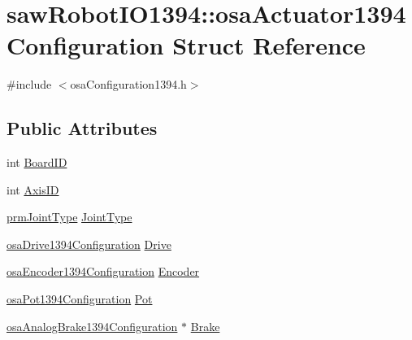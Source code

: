 \hypertarget{structsaw_robot_i_o1394_1_1osa_actuator1394_configuration}{}\section{saw\+Robot\+I\+O1394\+:\+:osa\+Actuator1394\+Configuration Struct Reference}
\label{structsaw_robot_i_o1394_1_1osa_actuator1394_configuration}


{\ttfamily \#include $<$osa\+Configuration1394.\+h$>$}

\subsection*{Public Attributes}
\begin{DoxyCompactItemize}
\item 
int \hyperlink{structsaw_robot_i_o1394_1_1osa_actuator1394_configuration_a22cc3448ab6886b8b23dd8a16445ad86}{Board\+I\+D}
\item 
int \hyperlink{structsaw_robot_i_o1394_1_1osa_actuator1394_configuration_afef5e3b088b5b6bd63c71e424ac9b48b}{Axis\+I\+D}
\item 
\hyperlink{prm_joint_type_8h_a895942aa22779beb318114dcff38b5af}{prm\+Joint\+Type} \hyperlink{structsaw_robot_i_o1394_1_1osa_actuator1394_configuration_a4f232ffae661ac78270858c1c68c2859}{Joint\+Type}
\item 
\hyperlink{structsaw_robot_i_o1394_1_1osa_drive1394_configuration}{osa\+Drive1394\+Configuration} \hyperlink{structsaw_robot_i_o1394_1_1osa_actuator1394_configuration_aa2c6db368b235c58efb11afa489d9f0e}{Drive}
\item 
\hyperlink{structsaw_robot_i_o1394_1_1osa_encoder1394_configuration}{osa\+Encoder1394\+Configuration} \hyperlink{structsaw_robot_i_o1394_1_1osa_actuator1394_configuration_a9f6160c86aca21cc9024a0b4e8e58453}{Encoder}
\item 
\hyperlink{structsaw_robot_i_o1394_1_1osa_pot1394_configuration}{osa\+Pot1394\+Configuration} \hyperlink{structsaw_robot_i_o1394_1_1osa_actuator1394_configuration_a05332a1631f974de8304f4210e9e33e8}{Pot}
\item 
\hyperlink{structsaw_robot_i_o1394_1_1osa_analog_brake1394_configuration}{osa\+Analog\+Brake1394\+Configuration} $\ast$ \hyperlink{structsaw_robot_i_o1394_1_1osa_actuator1394_configuration_a000517ed63c5bcb3e7ff4f0605c44169}{Brake}
\end{DoxyCompactItemize}


